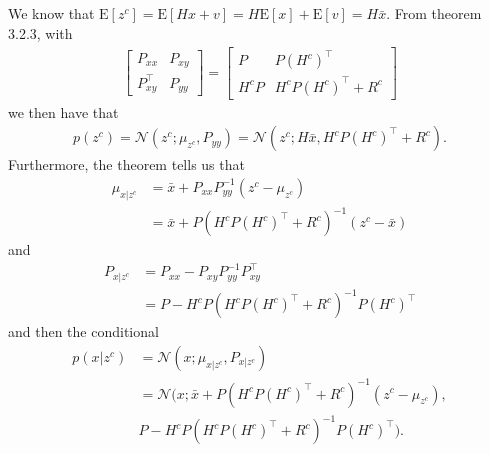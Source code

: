 \documentclass[]{article}
\begin{document}
\subsection{}
We know that $\text{E}[z^c] = \text{E}[Hx + v] = H\text{E}[x] + \text{E}[v] = H \bar x$.
From theorem 3.2.3, with
\begin{equation}\begin{aligned}
\begin{bmatrix}
P_{xx} & P_{xy} \\
P_{xy}^\top & P_{yy}
\end{bmatrix}
=
\begin{bmatrix}
P & P(H^c)^\top \\
H^c P & H^cP(H^c)^\top + R^c
\end{bmatrix}
\end{aligned}\end{equation}
we then have that
\begin{equation}\begin{aligned}
p(z^c) = \mathcal{N}(z^c;\mu_{z^c}, P_{yy}) = \mathcal{N}(z^c;H \bar x, H^cP(H^c)^\top + R^c).
\end{aligned}\end{equation}
Furthermore, the theorem tells us that
\begin{equation}\begin{aligned}
\mu_{x|z^c} &= \bar x + P_{xx}P_{yy}^{-1}(z^c - \mu_{z^c}) \\
&= \bar x + P(H^cP(H^c)^\top + R^c)^{-1}(z^c - \bar x)
\end{aligned}\end{equation}
and
\begin{equation}\begin{aligned}
P_{x|z^c} &= P_{xx} - P_{xy}P_{yy}^{-1}P_{xy}^\top \\
&= P - H^cP(H^cP(H^c)^\top + R^c)^{-1}P(H^c)^\top
\end{aligned}\end{equation}
and then the conditional
\begin{equation}\begin{aligned}
p(x|z^c) &= \mathcal{N}(x; \mu_{x|z^c}, P_{x|z^c}) \\
&= \mathcal{N}(x; \bar x + P(H^cP(H^c)^\top + R^c)^{-1}(z^c - \mu_{z^c}), \\
& P - H^cP(H^cP(H^c)^\top + R^c)^{-1}P(H^c)^\top). \\
\end{aligned}\end{equation}
\end{document}
